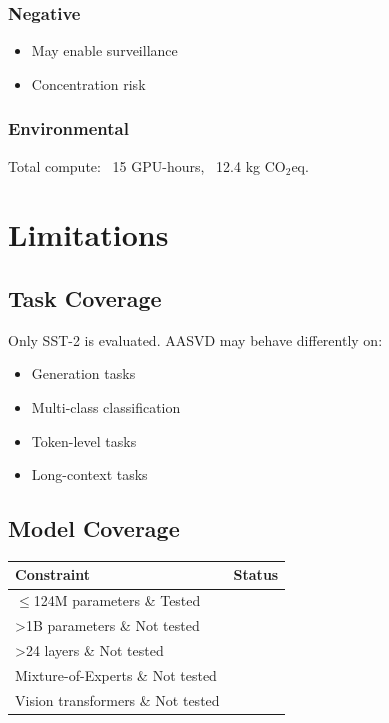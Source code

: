 \subsubsection{Negative}
\begin{itemize}
\item May enable surveillance
\item Concentration risk

\end{itemize}
\subsubsection{Environmental}
Total compute: ~15 GPU-hours, ~12.4 kg CO$_2$eq.


\section{Limitations}

\subsection{Task Coverage}

Only SST-2 is evaluated. AASVD may behave differently on:
\begin{itemize}
\item Generation tasks
\item Multi-class classification
\item Token-level tasks
\item Long-context tasks

\end{itemize}
\subsection{Model Coverage}

\begin{table}[H]
\centering
\small
\begin{tabular}{ll}
\toprule
\textbf{Constraint} & \textbf{Status} \\
\midrule
$\le$124M parameters \& Tested \\
\textgreater{}1B parameters \& Not tested \\
\textgreater{}24 layers \& Not tested \\
Mixture-of-Experts \& Not tested \\
Vision transformers \& Not tested \\
\bottomrule
\end{tabular}
\end{table}


